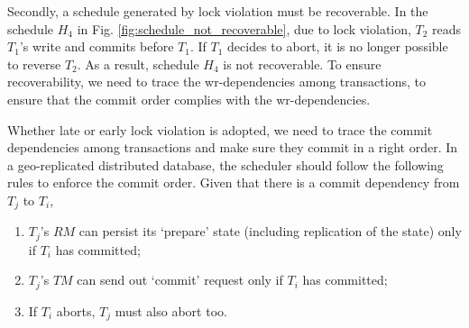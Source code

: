 \documentclass[conference]{IEEEtran}
\begin{document}


Secondly, a schedule generated by lock violation must be recoverable.
In the schedule ${H_4}$ in Fig.   \ref{fig:schedule_not_recoverable}, due to lock violation,
${T_2}$ reads  ${T_1}$'s write and commits before ${T_1}$.
If ${T_1}$ decides to abort, it is no longer possible to reverse ${T_2}$.
As a result, schedule ${H_4}$ is not recoverable.
To ensure recoverability, we need to trace the wr-dependencies among transactions, to ensure that the commit order complies with the wr-dependencies.






Whether late or early lock violation is adopted, we need to trace the commit dependencies among transactions and make sure they commit in a right order.
In a geo-replicated distributed database, the scheduler should follow the following rules to enforce the commit order.
Given that there is a commit dependency from ${T_j}$ to ${T_i}$,
\begin{enumerate}
  \item ${T_j}$'s $RM$ can persist its `prepare' state (including replication of the state) only if ${T_i}$ has committed;
  \label{rule:prepare}

  \item ${T_j}$'s $TM$ can send out `commit' request only if ${T_i}$ has committed;
  \label{rule:commit}

  \item If ${T_i}$ aborts, ${T_j}$ must also abort too.
  \label{rule:abort}
\end{enumerate}
\end{document}
